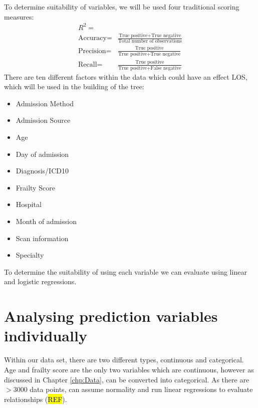 \documentclass[../thesis.tex]{subfiles}
\begin{document}
To determine suitability of variables, we will be used four traditional scoring measures:
\begin{align}
R^{2} = \\
    \text{Accuracy} = & \frac{\text{True positive}+\text{True negative}}{\text{Total number of observations}}\\
    \text{Precision} = & \frac{\text{True positive}}{\text{True positive}+\text{True negative}}\\
    \text{Recall} = & \frac{\text{True positive}}{\text{True positive}+\text{False negative}}
\end{align}
There are ten different factors within the data which could have an effect LOS, which will be used in the building of the tree:
\begin{multicols}{2}
\begin{itemize}
\item Admission Method
    \item Admission Source
    \item Age
    \item Day of admission
    \item Diagnosis/ICD10
    \item Frailty Score
    \item Hospital
    \item Month of admission
    \item Scan information
    \item Specialty
\end{itemize}
\end{multicols}
To determine the suitability of using each variable we can evaluate using linear and logistic regressions.
\section{Analysing prediction variables individually}
Within our data set, there are two different types, continuous and categorical. Age and frailty score are the only two variables which are continuous, however as discussed in Chapter \ref{chp:Data}, can be converted into categorical.
As there are $>$3000 data points, can assume normality and run linear regressions to evaluate relationships (\hl{REF}).
\end{document}
